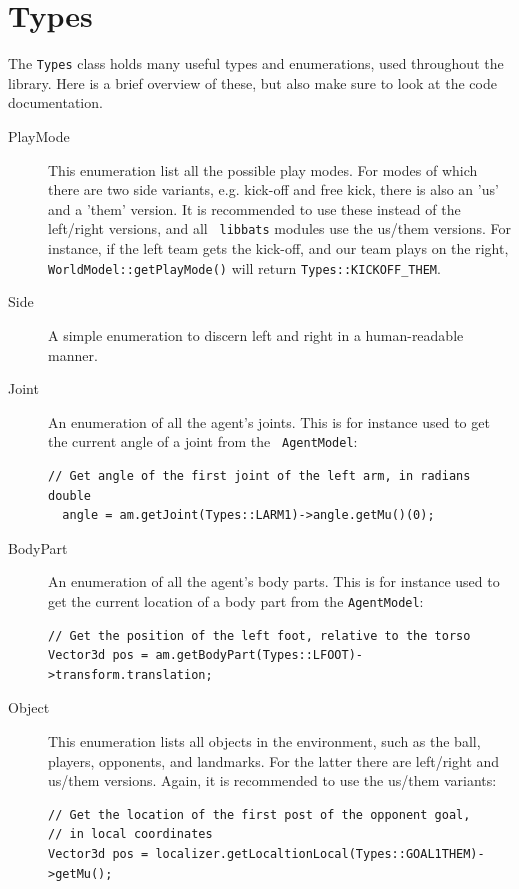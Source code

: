 \section{Types}

The {\tt Types} class holds many useful types and enumerations, used
throughout the library. Here is a brief overview of these, but also
make sure to look at the code documentation.
\begin{description}
\item[PlayMode] This enumeration list all the possible play modes. For
  modes of which there are two side variants, e.g. kick-off and free
  kick, there is also an 'us' and a 'them' version. It is recommended
  to use these instead of the left/right versions, and all {\tt
    libbats} modules use the us/them versions. For instance, if the
  left team gets the kick-off, and our team plays on the right, {\tt
    WorldModel::getPlayMode()} will return {\tt Types::KICKOFF\_THEM}.
\item[Side] A simple enumeration to discern left and right in a
  human-readable manner.
\item[Joint] An enumeration of all the agent's joints. This is for
  instance used to get the current angle of a joint from the {\tt
    AgentModel}:
\begin{lstlisting}[frame=single]
  // Get angle of the first joint of the left arm, in radians double
  angle = am.getJoint(Types::LARM1)->angle.getMu()(0);
\end{lstlisting}
\item[BodyPart] An enumeration of all the agent's body parts. This is
  for instance used to get the current location of a body part from
  the {\tt AgentModel}:
\begin{lstlisting}[frame=single]
// Get the position of the left foot, relative to the torso
Vector3d pos = am.getBodyPart(Types::LFOOT)->transform.translation;
\end{lstlisting}
\item[Object] This enumeration lists all objects in the environment,
  such as the ball, players, opponents, and landmarks. For the latter
  there are left/right and us/them versions. Again, it is recommended
  to use the us/them variants:
\begin{lstlisting}[frame=single]
// Get the location of the first post of the opponent goal,
// in local coordinates
Vector3d pos = localizer.getLocaltionLocal(Types::GOAL1THEM)->getMu();
\end{lstlisting}
\end{description}


